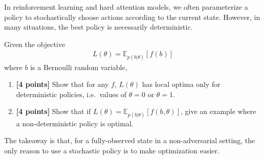 \documentclass{harvardml}
\newcommand{\E}{\mathbb{E}}
\theoremstyle{plain}
\begin{document}







\begin{problem}

In reinforcement learning and hard attention models, we often parameterize a policy to stochastically choose actions according to the current state.
However, in many situations, the best policy is necessarily deterministic.

Given the objective
%
\begin{align}
L(\theta) = \E_{p(b|\theta)} \left[ f(b) \right]
\end{align}
%
where $b$ is a Bernoulli random variable,

\begin{enumerate}[label=(\alph*)]
\item {\bf [4 points]} Show that for any $f$, $L(\theta)$ has local optima only for deterministic policies, i.e.\ values of $\theta = 0$ or $\theta = 1$.

\item {\bf [4 points]} Show that if $L(\theta) = \E_{p(b|\theta)} \left[ f(b, \theta) \right]$, give an example where a non-deterministic policy is optimal.
\end{enumerate}

The takeaway is that, for a fully-observed state in a non-adversarial setting, the only reason to use a stochastic policy is to make optimization easier.
\end{problem}




\end{document}
